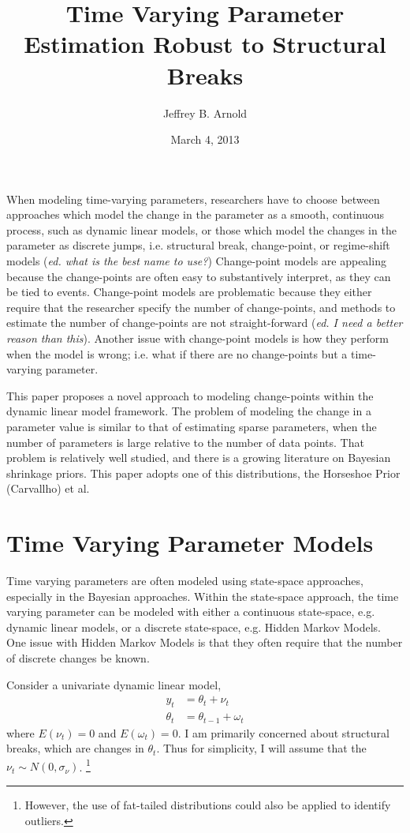 \documentclass{article}
\author{Jeffrey B. Arnold}
\title{Time Varying Parameter Estimation Robust to Structural Breaks}
\date{March 4, 2013}
\begin{document}
When modeling time-varying parameters, researchers have to choose between approaches which model the change in the parameter as a smooth, continuous process, such as dynamic linear models, or those which model the changes in the parameter as discrete jumps, i.e. structural break, change-point, or regime-shift models (\textit{ed. what is the best name to use?})
Change-point models are appealing because the change-points are often easy to substantively interpret, as they can be tied to events.
Change-point models are problematic because they either require that the researcher specify the number of change-points, and methods to estimate the number of change-points are not straight-forward (\textit{ed. I need a better reason than this}).
Another issue with change-point models is how they perform when the model is wrong; i.e. what if there are no change-points but a time-varying parameter.

This paper proposes a novel approach to modeling change-points within the dynamic linear model framework.
The problem of modeling the change in a parameter value is similar to that of estimating sparse parameters, when the number of parameters is large relative to the number of data points.
That problem is relatively well studied, and there is a growing literature on Bayesian shrinkage priors.
This paper adopts one of this distributions, the Horseshoe Prior (Carvallho) et al. 

\section{Time Varying Parameter Models}
\label{sec:time-vary-param}


Time varying parameters are often modeled using state-space approaches, especially in the Bayesian approaches.
Within the state-space approach, the time varying parameter can be modeled with either a continuous state-space, e.g. dynamic linear models, or a discrete state-space, e.g. Hidden Markov Models.
One issue with Hidden Markov Models is that they often require that the number of discrete changes be known.

Consider a univariate dynamic linear model,
$$
\begin{aligned}
y_t &= \theta_t + \nu_t \\
\theta_t &= \theta_{t-1} + \omega_t
\end{aligned}
$$
where $E(\nu_t) = 0$ and $E(\omega_t) = 0$.
I am primarily concerned about structural breaks, which are changes in $\theta_{t}$.
Thus for simplicity, I will assume that the $\nu_t \sim N(0, \sigma_\nu)$.%
\footnote{However, the use of fat-tailed distributions could also be
  applied to identify outliers.}
\end{document}
